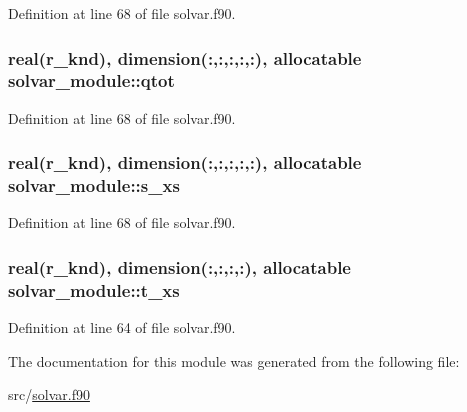 Definition at line 68 of file solvar.\-f90.

\hypertarget{classsolvar__module_aea3d3733a1576348496e9e070924ad62}{
\subsubsection[{qtot}]{\setlength{\rightskip}{0pt plus 5cm}real(r\-\_\-knd), dimension(\-:,\-:,\-:,\-:,\-:), allocatable solvar\-\_\-module\-::qtot}}\label{classsolvar__module_aea3d3733a1576348496e9e070924ad62}


Definition at line 68 of file solvar.\-f90.

\hypertarget{classsolvar__module_ab36a684b0d77a635a3eb402da029b7b7}{
\subsubsection[{s\-\_\-xs}]{\setlength{\rightskip}{0pt plus 5cm}real(r\-\_\-knd), dimension(\-:,\-:,\-:,\-:,\-:), allocatable solvar\-\_\-module\-::s\-\_\-xs}}\label{classsolvar__module_ab36a684b0d77a635a3eb402da029b7b7}


Definition at line 68 of file solvar.\-f90.

\hypertarget{classsolvar__module_ad35df9ae79e394c41cd47d92a0f26da7}{
\subsubsection[{t\-\_\-xs}]{\setlength{\rightskip}{0pt plus 5cm}real(r\-\_\-knd), dimension(\-:,\-:,\-:,\-:), allocatable solvar\-\_\-module\-::t\-\_\-xs}}\label{classsolvar__module_ad35df9ae79e394c41cd47d92a0f26da7}


Definition at line 64 of file solvar.\-f90.



The documentation for this module was generated from the following file\-:\begin{DoxyCompactItemize}
\item 
src/\hyperlink{solvar_8f90}{solvar.\-f90}\end{DoxyCompactItemize}
